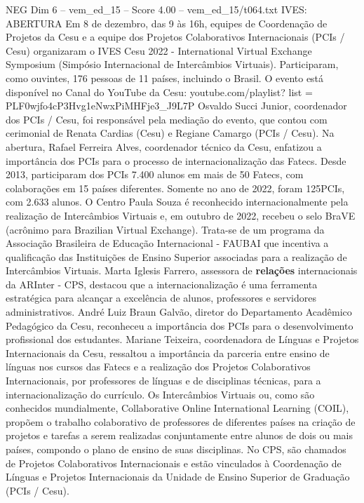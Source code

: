 \begin{textsample}{NEG Dim 6 – vem\_ed\_15 – Score 4.00 – vem\_ed\_15/t064.txt}  \label{ex:f6_neg_142}
IVES: ABERTURA Em 8 de dezembro, das 9 às 16h, equipes de Coordenação de Projetos da Cesu e a equipe dos Projetos Colaborativos Internacionais (PCIs / Cesu) organizaram o IVES Cesu 2022 - International Virtual Exchange Symposium (Simpósio Internacional de Intercâmbios Virtuais).
Participaram, como ouvintes, 176 pessoas de 11 países, incluindo o Brasil.
O evento está disponível no Canal do YouTube da Cesu: youtube.com/playlist? list = PLF0wjfo4cP3Hvg1eNwxPiMHFje3\_J9L7P Osvaldo Succi Junior, coordenador dos PCIs / Cesu, foi responsável pela mediação do evento, que contou com cerimonial de Renata Cardias (Cesu) e Regiane Camargo (PCIs / Cesu).
Na abertura, Rafael Ferreira Alves, coordenador técnico da Cesu, enfatizou a importância dos PCIs para o processo de internacionalização das Fatecs.
Desde 2013, participaram dos PCIs 7.400 alunos em mais de 50 Fatecs, com colaborações em 15 países diferentes.
Somente no ano de 2022, foram 125PCIs, com 2.633 alunos.
O Centro Paula Souza é reconhecido internacionalmente pela realização de Intercâmbios Virtuais e, em outubro de 2022, recebeu o selo BraVE (acrônimo para Brazilian Virtual Exchange).
Trata-se de um programa da Associação Brasileira de Educação Internacional - FAUBAI que incentiva a qualificação das Instituições de Ensino Superior associadas para a realização de Intercâmbios Virtuais.
Marta Iglesis Farrero, assessora de \textbf{relações} internacionais da ARInter - CPS, destacou que a internacionalização é uma ferramenta estratégica para alcançar a excelência de alunos, professores e servidores administrativos.
André Luiz Braun Galvão, diretor do Departamento Acadêmico Pedagógico da Cesu, reconheceu a importância dos PCIs para o desenvolvimento profissional dos estudantes.
Mariane Teixeira, coordenadora de Línguas e Projetos Internacionais da Cesu, ressaltou a importância da parceria entre ensino de línguas nos cursos das Fatecs e a realização dos Projetos Colaborativos Internacionais, por professores de línguas e de disciplinas técnicas, para a internacionalização do currículo.
Os Intercâmbios Virtuais ou, como são conhecidos mundialmente, Collaborative Online International Learning (COIL), propõem o trabalho colaborativo de professores de diferentes países na criação de projetos e tarefas a serem realizadas conjuntamente entre alunos de dois ou mais países, compondo o plano de ensino de suas disciplinas.
No CPS, são chamados de Projetos Colaborativos Internacionais e estão vinculados à Coordenação de Línguas e Projetos Internacionais da Unidade de Ensino Superior de Graduação (PCIs / Cesu).

\end{textsample}
